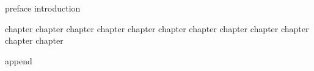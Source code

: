\documentclass{claynote}
\begin{document}
\begin{void}
{

    \begin{pre}
        {preface}
        {introduction}
    \end{pre}

    \begin{body}
        {chapter}
        {chapter}
        {chapter}
        {chapter}
        {chapter}
        {chapter}
        {chapter}
        {chapter}
        {chapter}
        {chapter}
        {chapter}
        {chapter}
    \end{body}

    \begin{append}
        {append}
    \end{append}
}
\end{void}
\end{document}

